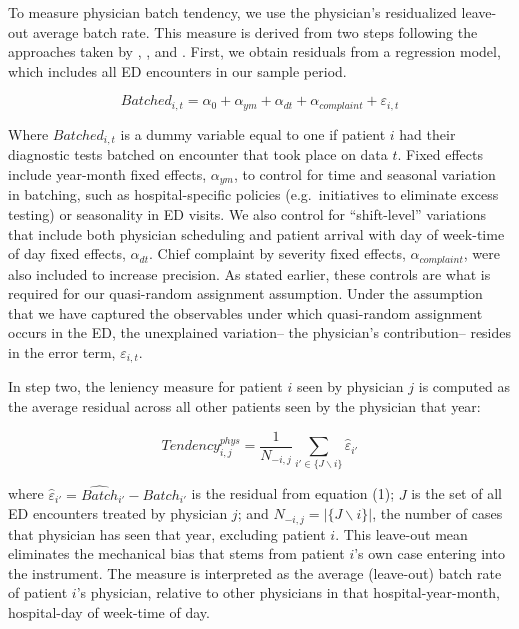 \documentclass[,,nonblindrev]{informs}
\begin{document}
To measure physician batch tendency, we use the physician's residualized
leave-out average batch rate. This measure is derived from two steps
following the approaches taken by \citet{doyle2015measuring},
\citet{dobbie2018effects}, and \citet{eichmeyer2022pathways}. First, we
obtain residuals from a regression model, which includes all ED
encounters in our sample period.

\begin{equation}
Batched_{i,t} = \alpha_0 + \alpha_{ym} + \alpha_{dt} + \alpha_{complaint} + \varepsilon_{i,t}
\end{equation}

Where \(Batched_{i,t}\) is a dummy variable equal to one if patient
\(i\) had their diagnostic tests batched on encounter that took place on
data \(t\). Fixed effects include year-month fixed effects,
\(\alpha_{ym}\), to control for time and seasonal variation in batching,
such as hospital-specific policies (e.g.~initiatives to eliminate excess
testing) or seasonality in ED visits. We also control for
``shift-level'' variations that include both physician scheduling and
patient arrival with day of week-time of day fixed effects,
\(\alpha_{dt}\). Chief complaint by severity fixed effects,
\(\alpha_{complaint}\), were also included to increase precision. As
stated earlier, these controls are what is required for our quasi-random
assignment assumption. Under the assumption that we have captured the
observables under which quasi-random assignment occurs in the ED, the
unexplained variation-- the physician's contribution-- resides in the
error term, \(\varepsilon_{i,t}\).

In step two, the leniency measure for patient \(i\) seen by physician
\(j\) is computed as the average residual across all other patients seen
by the physician that year:

\begin{equation}
Tendency_{i,j}^{phys} =
\frac{1}{N_{-i,j}} \sum_{i' \in \{J \backslash i\}}\hat{\varepsilon}_{i'}
\end{equation}

where \(\hat{\varepsilon}_{i'} = \hat{Batch}_{i'} - Batch_{i'}\) is the
residual from equation (1); \(J\) is the set of all ED encounters
treated by physician \(j\); and \(N_{-i,j} = |\{J \backslash i\}|\), the
number of cases that physician has seen that year, excluding patient
\(i\). This leave-out mean eliminates the mechanical bias that stems
from patient \(i\)'s own case entering into the instrument. The measure
is interpreted as the average (leave-out) batch rate of patient \(i\)'s
physician, relative to other physicians in that hospital-year-month,
hospital-day of week-time of day.
\end{document}
